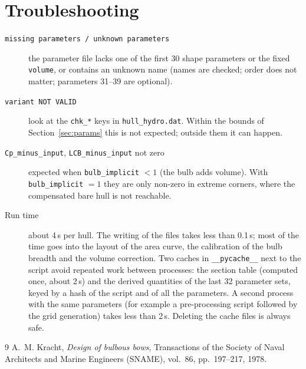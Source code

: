 \documentclass[11pt,a4paper]{article}
\newcommand{\cmd}[1]{\texttt{#1}}
\begin{document}
\section{Troubleshooting}
\begin{description}
\item[\cmd{missing parameters / unknown parameters}] the parameter file lacks one of the first 30
  shape parameters or the fixed \cmd{volume}, or contains an unknown name (names are checked;
  order does not matter; parameters 31--39 are optional).
\item[\cmd{variant NOT VALID}] look at the \cmd{chk\_*} keys in \cmd{hull\_hydro.dat}. Within
  the bounds of Section~\ref{sec:params} this is not expected; outside them it can happen.
\item[\cmd{Cp\_minus\_input}, \cmd{LCB\_minus\_input} not zero] expected when
  \cmd{bulb\_implicit} $<1$ (the bulb adds volume). With \cmd{bulb\_implicit} $=1$ they are only
  non-zero in extreme corners, where the compensated bare hull is not reachable.
\item[Run time] \label{sec:cache} about 4\,s per hull. The writing of the files takes less than
  0.1\,s; most of the time goes into the layout of the area curve, the calibration of the bulb
  breadth and the volume correction. Two caches in \cmd{\_\_pycache\_\_} next to the script avoid
  repeated work between processes: the section table (computed once, about 2\,s) and the derived
  quantities of the last 32 parameter sets, keyed by a hash of the script and of all the
  parameters. A second process with the same parameters (for example a pre-processing script
  followed by the grid generation) takes less than 2\,s. Deleting the cache files is always
  safe.
\end{description}

\begin{thebibliography}{9}
A.~M. Kracht, \emph{Design of bulbous bows}, Transactions of the Society of Naval Architects
and Marine Engineers (SNAME), vol.~86, pp.~197--217, 1978.
\end{thebibliography}
\end{document}
